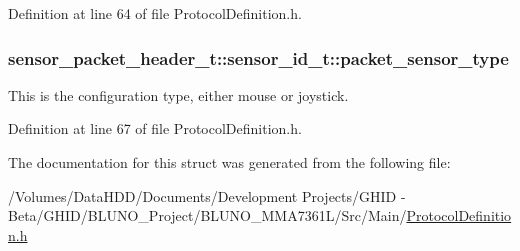 \-Definition at line 64 of file \-Protocol\-Definition.\-h.

\hypertarget{structsensor__packet__header__t_1_1sensor__id__t_ac75342f878e2f127ddd4217eb3857a0b}{
\subsubsection[{packet\-\_\-sensor\-\_\-type}]{ {\bf sensor\-\_\-packet\-\_\-header\-\_\-t\-::sensor\-\_\-id\-\_\-t\-::packet\-\_\-sensor\-\_\-type}}}\label{structsensor__packet__header__t_1_1sensor__id__t_ac75342f878e2f127ddd4217eb3857a0b}


\-This is the configuration type, either mouse or joystick. 



\-Definition at line 67 of file \-Protocol\-Definition.\-h.



\-The documentation for this struct was generated from the following file\-:\begin{DoxyCompactItemize}
\item 
/\-Volumes/\-Data\-H\-D\-D/\-Documents/\-Development Projects/\-G\-H\-I\-D -\/ Beta/\-G\-H\-I\-D/\-B\-L\-U\-N\-O\-\_\-\-Project/\-B\-L\-U\-N\-O\-\_\-\-M\-M\-A7361\-L/\-Src/\-Main/\hyperlink{_protocol_definition_8h}{\-Protocol\-Definition.\-h}\end{DoxyCompactItemize}
